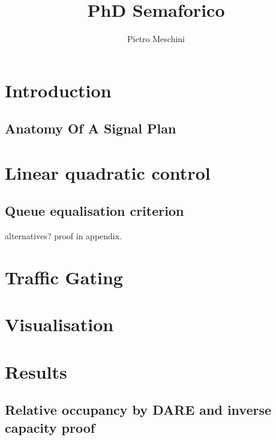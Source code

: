 \documentclass{mzkThesis}
\author{Pietro Meschini}
\title{PhD Semaforico}
\begin{document}
\frontmatter



\mainmatter
\chapter{Introduction}
\section{Anatomy Of A Signal Plan}



\chapter{Linear quadratic control}
\section{Queue equalisation criterion}
alternatives? proof in appendix.

\chapter{Traffic Gating}

\chapter{Visualisation}

\chapter{Results}


\appendix
\section{Relative occupancy by DARE and inverse capacity proof}

\backmatter

\printindex
\end{document}
